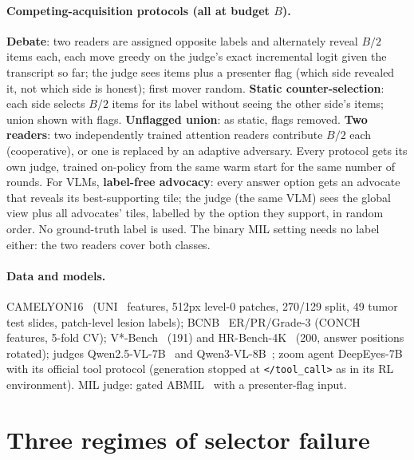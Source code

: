 \documentclass[10pt,twocolumn,letterpaper]{article}
\begin{document}
\paragraph{Competing-acquisition protocols (all at budget $B$).} \textbf{Debate}: two readers are assigned opposite labels and alternately reveal $B/2$ items each, each move greedy on the judge's exact incremental logit given the transcript so far; the judge sees items plus a presenter flag (which side revealed it, not which side is honest); first mover random. \textbf{Static counter-selection}: each side selects $B/2$ items for its label without seeing the other side's items; union shown with flags. \textbf{Unflagged union}: as static, flags removed. \textbf{Two readers}: two independently trained attention readers contribute $B/2$ each (cooperative), or one is replaced by an adaptive adversary. Every protocol gets its own judge, trained on-policy from the same warm start for the same number of rounds. For VLMs, \textbf{label-free advocacy}: every answer option gets an advocate that reveals its best-supporting tile; the judge (the same VLM) sees the global view plus all advocates' tiles, labelled by the option they support, in random order. No ground-truth label is used. The binary MIL setting needs no label either: the two readers cover both classes.
\paragraph{Data and models.} CAMELYON16~\cite{c16} (UNI~\cite{uni} features, 512px level-0 patches, 270/129 split, 49 tumor test slides, patch-level lesion labels); BCNB~\cite{bcnb} ER/PR/Grade-3 (CONCH~\cite{conch} features, 5-fold CV); V*-Bench~\cite{wu2024vstar} (191) and HR-Bench-4K~\cite{hrbench} (200, answer positions rotated); judges Qwen2.5-VL-7B~\cite{qwen25vl} and Qwen3-VL-8B~\cite{qwen3vl}; zoom agent DeepEyes-7B~\cite{zheng2025deepeyes} with its official tool protocol (generation stopped at \texttt{</tool\_call>} as in its RL environment). MIL judge: gated ABMIL~\cite{ilse2018abmil} with a presenter-flag input.

\section{Three regimes of selector failure}\label{sec:regimes}
\end{document}
